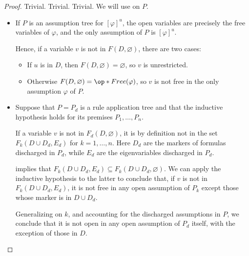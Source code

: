 \begin{proof}
   Trivial.
   Trivial.
   Trivial.
   We will use  on \( P \).
  \begin{itemize}
    \item If \( P \) is an assumption tree for \( [\varphi]^u \), the open variables are precisely the free variables of \( \varphi \), and the only assumption of \( P \) is \( [\varphi]^u \).

    Hence, if a variable \( v \) is not in \( F(D, \varnothing) \), there are two cases:
    \begin{itemize}
      \item If \( u \) is in \( D \), then \( F(D, \varnothing) = \varnothing \), so \( v \) is unrestricted.
      \item Otherwise \( F(D, \varnothing) = \op*{Free}(\varphi) \), so \( v \) is not free in the only assumption \( \varphi \) of \( P \).
    \end{itemize}

    \item Suppose that \( P = P_d \) is a rule application tree and that the inductive hypothesis holds for its premises \( P_1, \ldots, P_n \).

    If a variable \( v \) is not in \( F_d(D, \varnothing) \), it is by definition not in the set \( F_k(D \cup D_d, E_d) \) for \( k = 1, \ldots, n \). Here \( D_d \) are the markers of formulas discharged in \( P_d \), while \( E_d \) are the eigenvariables discharged in \( P_d \).

     implies that \( F_k(D \cup D_d, E_d) \subseteq F_k(D \cup D_d, \varnothing) \). We can apply the inductive hypothesis to the latter to conclude that, if \( v \) is not in \( F_k(D \cup D_d, E_d) \), it is not free in any open assumption of \( P_k \) except those whose marker is in \( D \cup D_d \).

    Generalizing on \( k \), and accounting for the discharged assumptions in \( P \), we conclude that it is not open in any open assumption of \( P_d \) itself, with the exception of those in \( D \).
  \end{itemize}
\end{proof}

